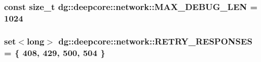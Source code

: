 \subsubsection[{\texorpdfstring{M\+A\+X\+\_\+\+D\+E\+B\+U\+G\+\_\+\+L\+EN}{MAX_DEBUG_LEN}}]{\setlength{\rightskip}{0pt plus 5cm}const size\+\_\+t dg\+::deepcore\+::network\+::\+M\+A\+X\+\_\+\+D\+E\+B\+U\+G\+\_\+\+L\+EN = 1024\hspace{0.3cm}{\ttfamily [static]}}\hypertarget{namespacedg_1_1deepcore_1_1network_aab421b85c3d0dc5fecb970e3790f9e0b}{}\label{namespacedg_1_1deepcore_1_1network_aab421b85c3d0dc5fecb970e3790f9e0b}
\subsubsection[{\texorpdfstring{R\+E\+T\+R\+Y\+\_\+\+R\+E\+S\+P\+O\+N\+S\+ES}{RETRY_RESPONSES}}]{\setlength{\rightskip}{0pt plus 5cm}set$<$long$>$ dg\+::deepcore\+::network\+::\+R\+E\+T\+R\+Y\+\_\+\+R\+E\+S\+P\+O\+N\+S\+ES = \{ 408, 429, 500, 504 \}}\hypertarget{namespacedg_1_1deepcore_1_1network_aac2ec119bfabeb0695c296eeffaac58c}{}\label{namespacedg_1_1deepcore_1_1network_aac2ec119bfabeb0695c296eeffaac58c}
